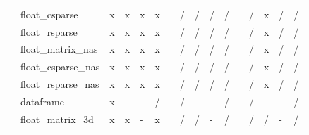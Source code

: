 \documentclass{article}
\begin{document}
\begin{longtable}{llllllllllllllll}
                & float\_csparse            & \cellcolor[HTML]{B7E1CD}x & \cellcolor[HTML]{B7E1CD}x & \cellcolor[HTML]{B7E1CD}x & \cellcolor[HTML]{B7E1CD}x &  & \cellcolor[HTML]{F4CCCC}/ & \cellcolor[HTML]{F4CCCC}/ & \cellcolor[HTML]{F4CCCC}/ & \cellcolor[HTML]{F4CCCC}/ &  & \cellcolor[HTML]{F4CCCC}/ & \cellcolor[HTML]{B7E1CD}x & \cellcolor[HTML]{F4CCCC}/ & \cellcolor[HTML]{F4CCCC}/ \\
                & float\_rsparse            & \cellcolor[HTML]{B7E1CD}x & \cellcolor[HTML]{B7E1CD}x & \cellcolor[HTML]{B7E1CD}x & \cellcolor[HTML]{B7E1CD}x &  & \cellcolor[HTML]{F4CCCC}/ & \cellcolor[HTML]{F4CCCC}/ & \cellcolor[HTML]{F4CCCC}/ & \cellcolor[HTML]{F4CCCC}/ &  & \cellcolor[HTML]{F4CCCC}/ & \cellcolor[HTML]{B7E1CD}x & \cellcolor[HTML]{F4CCCC}/ & \cellcolor[HTML]{F4CCCC}/ \\
                & float\_matrix\_nas        & \cellcolor[HTML]{B7E1CD}x & \cellcolor[HTML]{B7E1CD}x & \cellcolor[HTML]{B7E1CD}x & \cellcolor[HTML]{B7E1CD}x &  & \cellcolor[HTML]{F4CCCC}/ & \cellcolor[HTML]{F4CCCC}/ & \cellcolor[HTML]{F4CCCC}/ & \cellcolor[HTML]{F4CCCC}/ &  & \cellcolor[HTML]{F4CCCC}/ & \cellcolor[HTML]{B7E1CD}x & \cellcolor[HTML]{F4CCCC}/ & \cellcolor[HTML]{F4CCCC}/ \\
                & float\_csparse\_nas       & \cellcolor[HTML]{B7E1CD}x & \cellcolor[HTML]{B7E1CD}x & \cellcolor[HTML]{B7E1CD}x & \cellcolor[HTML]{B7E1CD}x &  & \cellcolor[HTML]{F4CCCC}/ & \cellcolor[HTML]{F4CCCC}/ & \cellcolor[HTML]{F4CCCC}/ & \cellcolor[HTML]{F4CCCC}/ &  & \cellcolor[HTML]{F4CCCC}/ & \cellcolor[HTML]{B7E1CD}x & \cellcolor[HTML]{F4CCCC}/ & \cellcolor[HTML]{F4CCCC}/ \\
                & float\_rsparse\_nas       & \cellcolor[HTML]{B7E1CD}x & \cellcolor[HTML]{B7E1CD}x & \cellcolor[HTML]{B7E1CD}x & \cellcolor[HTML]{B7E1CD}x &  & \cellcolor[HTML]{F4CCCC}/ & \cellcolor[HTML]{F4CCCC}/ & \cellcolor[HTML]{F4CCCC}/ & \cellcolor[HTML]{F4CCCC}/ &  & \cellcolor[HTML]{F4CCCC}/ & \cellcolor[HTML]{B7E1CD}x & \cellcolor[HTML]{F4CCCC}/ & \cellcolor[HTML]{F4CCCC}/ \\
                & dataframe                 & \cellcolor[HTML]{B7E1CD}x & \cellcolor[HTML]{CFE2F3}- & \cellcolor[HTML]{CFE2F3}- & \cellcolor[HTML]{F4CCCC}/ &  & \cellcolor[HTML]{F4CCCC}/ & \cellcolor[HTML]{CFE2F3}- & \cellcolor[HTML]{CFE2F3}- & \cellcolor[HTML]{F4CCCC}/ &  & \cellcolor[HTML]{F4CCCC}/ & \cellcolor[HTML]{CFE2F3}- & \cellcolor[HTML]{CFE2F3}- & \cellcolor[HTML]{F4CCCC}/ \\
                & float\_matrix\_3d         & \cellcolor[HTML]{B7E1CD}x & \cellcolor[HTML]{B7E1CD}x & \cellcolor[HTML]{CFE2F3}- & \cellcolor[HTML]{B7E1CD}x &  & \cellcolor[HTML]{F4CCCC}/ & \cellcolor[HTML]{F4CCCC}/ & \cellcolor[HTML]{CFE2F3}- & \cellcolor[HTML]{F4CCCC}/ &  & \cellcolor[HTML]{F4CCCC}/ & \cellcolor[HTML]{F4CCCC}/ & \cellcolor[HTML]{CFE2F3}- & \cellcolor[HTML]{F4CCCC}/ \\

\end{longtable}
\end{document}

